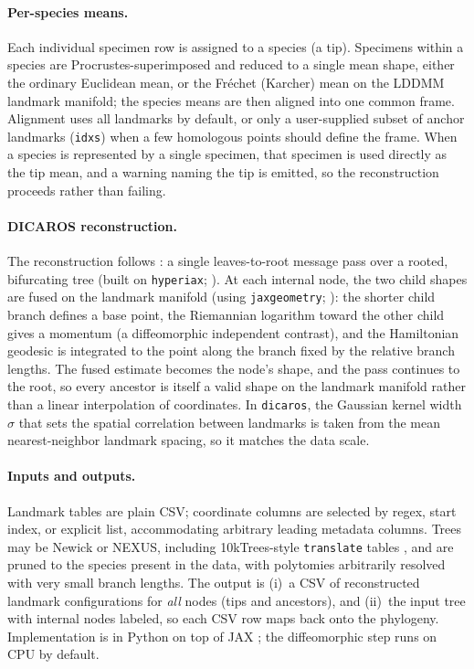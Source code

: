 \documentclass[twocolumn,10pt]{article}
\begin{document}
\paragraph{Per-species means.} Each individual specimen row is assigned to a species (a tip). Specimens within a species are Procrustes-superimposed \citep{gower1975generalized,rohlf1990procrustes} and reduced to a single mean shape, either the ordinary Euclidean mean, or the Fréchet (Karcher) mean on the LDDMM landmark manifold; the species means are then aligned into one common frame. Alignment uses all landmarks by default, or only a user-supplied subset of anchor landmarks (\texttt{idxs}) when a few homologous points should define the frame. When a species is represented by a single specimen, that specimen is used directly as the tip mean, and a warning naming the tip is emitted, so the reconstruction proceeds rather than failing.

\paragraph{DICAROS reconstruction.} The reconstruction follows \citet{severinsen2026dicaros}: a single leaves-to-root message pass over a rooted, bifurcating tree (built on \texttt{hyperiax}; \citealp{hyperiax}). At each internal node, the two child shapes are fused on the landmark manifold (using \texttt{jaxgeometry}; \citealp{jaxgeometry}): the shorter child branch defines a base point, the Riemannian logarithm toward the other child gives a momentum (a diffeomorphic independent contrast), and the Hamiltonian geodesic is integrated to the point along the branch fixed by the relative branch lengths. The fused estimate becomes the node's shape, and the pass continues to the root,
so every ancestor is itself a valid shape on the landmark manifold rather than a linear interpolation of coordinates. In \texttt{dicaros}, the Gaussian kernel width $\sigma$ that sets the spatial correlation between landmarks is taken from the mean nearest-neighbor landmark spacing, so it matches the data scale.

\paragraph{Inputs and outputs.} Landmark tables are plain CSV; coordinate columns are selected by regex, start index, or explicit list, accommodating
arbitrary leading metadata columns. Trees may be Newick or NEXUS, including 10kTrees-style \texttt{translate} tables \citep{arnold2010tenktrees}, and are pruned to the species present in the data, with polytomies arbitrarily resolved with very small branch lengths. The output is (i)~a CSV of reconstructed landmark configurations for \emph{all} nodes (tips
and ancestors), and (ii)~the input tree with internal nodes labeled, so each CSV row maps back onto the phylogeny. Implementation is in Python on top of JAX
\citep{jax2018github}; the diffeomorphic step runs on CPU by default.
\end{document}

